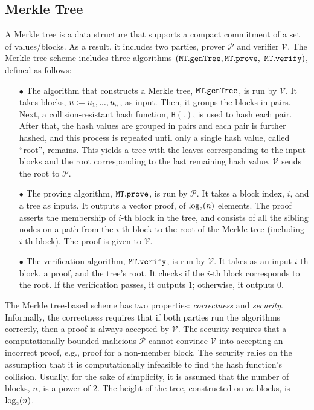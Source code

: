 

\subsection{Merkle Tree}\label{sec::merkle-tree}


A Merkle tree is a data structure that supports a compact commitment of a set of values/blocks.  As a result, it includes two parties, prover $\mathcal{P}$ and verifier $\mathcal{V}$. The  Merkle tree scheme includes three algorithms $(\mathtt{MT.genTree}, \mathtt{MT.prove},$ $\mathtt{MT.verify})$, defined as follows: 

\begin{itemize}
%
\item[$\bullet$] The algorithm that constructs a Merkle tree, $\mathtt{MT.genTree}$, is run by $\mathcal{V}$. It takes  blocks, $u:=u_{\scriptscriptstyle 1},...,u_{\scriptscriptstyle n}$, as input. Then, it groups the blocks  in pairs. Next,   a collision-resistant hash function, $\mathtt{H}(.)$, is used to hash each pair. After that, the hash values are grouped in pairs and each pair is further hashed, and this process is repeated until only a single hash value, called ``root'', remains. This yields a  tree with the leaves corresponding to the input blocks and the root corresponding to the last remaining hash value. $\mathcal{V}$ sends the root to $\mathcal{P}$.
%
\item[$\bullet$] The proving algorithm, $\mathtt{MT.prove}$, is run by $\mathcal{P}$. It takes a block index, $i$, and a tree as inputs. It outputs a vector proof, of  $\log_{\scriptscriptstyle 2}(n)$ elements. The proof asserts the membership of $i$-th block in the tree, and consists of all the sibling nodes on a path from the $i$-th block to the root of the Merkle tree (including $i$-th block). The proof is given to $\mathcal{V}$.
%
\item[$\bullet$] The verification algorithm, $\mathtt{MT.verify}$, is run by $\mathcal{V}$. It takes as an input $i$-th block, a proof, and the tree's root. It checks if the $i$-th block corresponds to the root. If the verification passes, it outputs $1$; otherwise, it outputs $0$.

\end{itemize}

The Merkle tree-based scheme has two properties: \emph{correctness} and \emph{security}. Informally, the correctness requires that if both parties run the algorithms correctly, then a proof is always accepted by  $\mathcal{V}$. The security requires that a computationally bounded malicious $\mathcal{P}$ cannot convince  $\mathcal{V}$ into accepting an incorrect proof, e.g., proof for a non-member block. The security relies on the assumption that it is computationally infeasible to find the hash function's collision. Usually, for the sake of simplicity, it is assumed that the number of blocks, $n$, is a power of $2$. The height of the tree, constructed on $m$ blocks, is $\log_{\scriptscriptstyle 2}(n)$. 